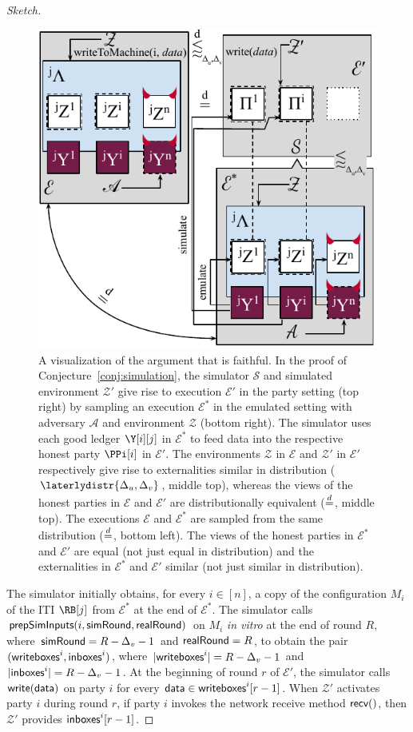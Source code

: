 \begin{proof}[Sketch]
  \begin{figure}
    \centering
    \includegraphics[width=0.7 \textwidth,keepaspectratio]{figures/rollerblade-emulation.pdf}
    \caption{A visualization of the argument that \rollerblade is faithful.
    In the proof of Conjecture~\ref{conj:simulation},
    the simulator $\mathcal{S}$ and simulated environment $\mathcal{Z}'$
    give rise to execution $\mathcal{E}'$ in the
    party setting (top right) by sampling an execution $\mathcal{E}^*$ in the emulated
    setting with adversary $\mathcal{A}$ and environment $\mathcal{Z}$
    (bottom right). The simulator uses each good ledger $\Y[i][j]$ in
    $\mathcal{E}^*$ to feed data into the respective honest party $\PPi[i]$
    in $\mathcal{E}'$. The environments $\mathcal{Z}$ in $\mathcal{E}$ and $\mathcal{Z}'$
    in $\mathcal{E}'$ respectively
    give rise to externalities similar in distribution ($\laterlydistr{\Delta_u,\Delta_v}$,
    middle top),
    whereas the views of the honest parties in $\mathcal{E}$
    and $\mathcal{E}'$ are distributionally equivalent ($\distreq$, middle top).
    The executions $\mathcal{E}$ and $\mathcal{E}^*$ are sampled
    from the same distribution ($\distreq$, bottom left).
    The views of the honest parties in $\mathcal{E}^*$ and $\mathcal{E}'$
    are equal (not just equal in distribution)
    and the externalities in $\mathcal{E}^*$ and $\mathcal{E}'$
    similar (not just similar in distribution).}
    \label{fig.conj.simulation}
  \end{figure}

  The simulator initially obtains, for every $i \in [n]$,
  a copy of the configuration $M_i$ of the ITI $\RB[j]$ from $\mathcal{E}^*$ at the end of
  $\mathcal{E}^*$.
  The simulator calls $\textsf{prepSimInputs}(i, \textsf{simRound}, \textsf{realRound})$ on $M_i$
  \emph{in vitro} at the end of round $R$, where $\textsf{simRound} = R - \Delta_v - 1$
  and $\textsf{realRound} = R$, to obtain the pair
  $(\textsf{writeboxes}^i, \textsf{inboxes}^i)$, where
  $|\textsf{writeboxes}^i| = R - \Delta_v - 1$
  and
  $|\textsf{inboxes}^i| = R - \Delta_v - 1$.
  At the beginning of round $r$ of $\mathcal{E}'$, the simulator calls
  $\textsf{write}(\textsf{data})$ on party $i$
  for every $\textsf{data} \in \textsf{writeboxes}^i[r - 1]$.
  When $\mathcal{Z}'$ activates party $i$ during round $r$,
  if party $i$ invokes the network receive method $\textsf{recv}()$, then $\mathcal{Z}'$
  provides $\textsf{inboxes}^i[r - 1]$.


\end{proof}

